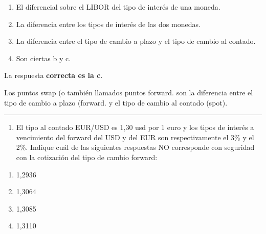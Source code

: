 \documentclass[
  letterpaper,
  DIV=11,
  numbers=noendperiod]{scrreprt}
\providecommand{\tightlist}{%
  \setlength{\itemsep}{0pt}\setlength{\parskip}{0pt}}\usepackage{longtable,booktabs,array}
\begin{document}
\begin{enumerate}
\def\labelenumi{\alph{enumi}.}
\item
  El diferencial sobre el LIBOR del tipo de interés de una moneda.
\item
  La diferencia entre los tipos de interés de las dos monedas.
\item
  La diferencia entre el tipo de cambio a plazo y el tipo de cambio al
  contado.
\item
  Son ciertas b y c.
\end{enumerate}

\begin{tcolorbox}[enhanced jigsaw, left=2mm, opacityback=0, colback=white, breakable, arc=.35mm, bottomrule=.15mm, rightrule=.15mm, toprule=.15mm, leftrule=.75mm, colframe=quarto-callout-tip-color-frame]
\begin{minipage}[t]{5.5mm}
\textcolor{quarto-callout-tip-color}{\faLightbulb}
\end{minipage}%
\begin{minipage}[t]{\textwidth - 5.5mm}

La respuesta \textbf{correcta es la c}.

Los puntos swap (o también llamados puntos forward. son la diferencia
entre el tipo de cambio a plazo (forward. y el tipo de cambio al contado
(spot).

\end{minipage}%
\end{tcolorbox}

\begin{center}\rule{0.5\linewidth}{0.5pt}\end{center}

\begin{enumerate}
\def\labelenumi{\arabic{enumi}.}
\setcounter{enumi}{27}
\tightlist
\item
  El tipo al contado EUR/USD es 1,30 usd por 1 euro y los tipos de
  interés a vencimiento del forward del USD y del EUR son
  respectivamente el 3\% y el 2\%. Indique cuál de las siguientes
  respuestas NO corresponde con seguridad con la cotización del tipo de
  cambio forward:
\end{enumerate}

\begin{enumerate}
\def\labelenumi{\alph{enumi}.}
\item
  1,2936
\item
  1,3064
\item
  1,3085
\item
  1,3110
\end{enumerate}
\end{document}
